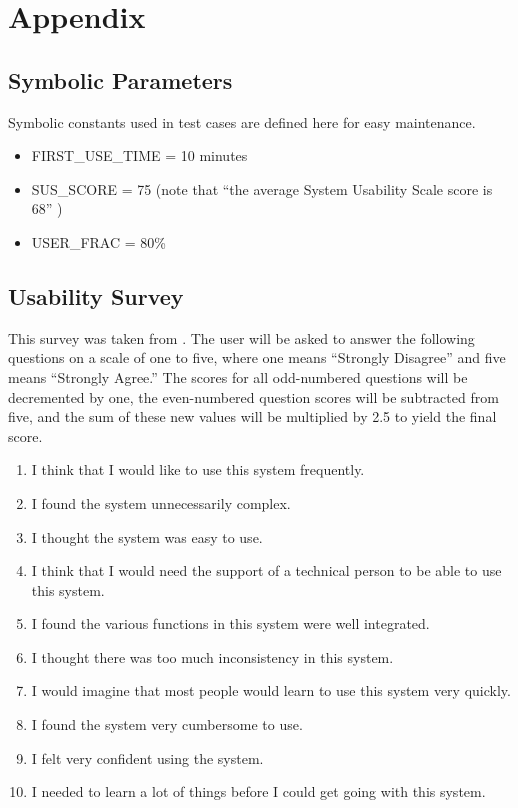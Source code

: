 \documentclass[12pt, titlepage]{article}
\begin{document}





\newpage

\section{Appendix}

\subsection{Symbolic Parameters}

Symbolic constants used in test cases are defined here for easy
maintenance.

\begin{itemize}
  \item FIRST\_USE\_TIME = 10 minutes
  \item SUS\_SCORE = 75 (note that ``the average System Usability Scale score
        is 68'' \cite{thomas_how_2015})
  \item USER\_FRAC = 80\%
\end{itemize}

\subsection{Usability Survey} \label{sec_usableSurvey}

This survey was taken from \cite{thomas_how_2015}. The user will be asked to
answer the following questions on a scale of one to five, where one means
``Strongly Disagree'' and five means ``Strongly Agree.'' The scores for all
odd-numbered questions will be decremented by one, the even-numbered question
scores will be subtracted from five, and the sum of these new values will be
multiplied by 2.5 to yield the final score.

\begin{enumerate}
  \item I think that I would like to use this system frequently.
  \item I found the system unnecessarily complex.
  \item I thought the system was easy to use.
  \item I think that I would need the support of a technical person to be able
        to use this system.
  \item I found the various functions in this system were well integrated.
  \item I thought there was too much inconsistency in this system.
  \item I would imagine that most people would learn to use this system very
        quickly.
  \item I found the system very cumbersome to use.
  \item I felt very confident using the system.
  \item I needed to learn a lot of things before I could get going with this
        system.
\end{enumerate}
\end{document}
